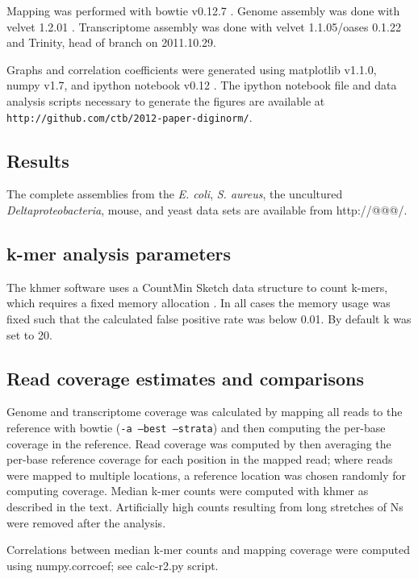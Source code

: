 \documentclass[10pt]{article}
\begin{document}
Mapping was performed with bowtie v0.12.7 \cite{pubmed19261174}.
Genome assembly was done with velvet 1.2.01 \cite{pubmed18349386}.
Transcriptome assembly was done with velvet 1.1.05/oases 0.1.22 and
Trinity, head of branch on 2011.10.29.

Graphs and correlation coefficients were generated using matplotlib
v1.1.0, numpy v1.7, and ipython notebook v0.12 \cite{ipython}.  The
ipython notebook file and data analysis scripts necessary to generate
the figures are available at {\tt
  http://github.com/ctb/2012-paper-diginorm/}.

\subsection*{Results}

The complete assemblies from the {\em E. coli}, {\em S. aureus}, the
uncultured {\em Deltaproteobacteria}, mouse, and yeast data sets are
available from http://@@@/.

\subsection*{k-mer analysis parameters}

The khmer software uses a CountMin Sketch data structure to count
k-mers, which requires a fixed memory allocation
\cite{countminsketch}.  In all cases the memory usage was fixed such
that the calculated false positive rate was below 0.01.  By default k
was set to 20.

\subsection*{Read coverage estimates and comparisons}

Genome and transcriptome coverage was calculated by mapping all reads
to the reference with bowtie ({\tt -a --best --strata}) and then
computing the per-base coverage in the reference.  Read coverage was
computed by then averaging the per-base reference coverage for each
position in the mapped read; where reads were mapped to multiple
locations, a reference location was chosen randomly for computing
coverage.  Median k-mer counts were computed with khmer as described
in the text.  Artificially high counts resulting from long stretches
of Ns were removed after the analysis.

Correlations between median k-mer counts and mapping coverage were
computed using numpy.corrcoef; see calc-r2.py script.
\end{document}
